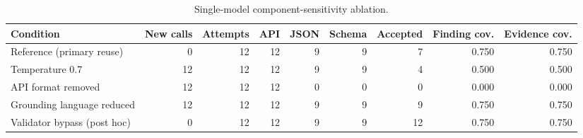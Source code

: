 \begin{table}[htbp]
\centering
\caption{Single-model component-sensitivity ablation.}
\label{tab:llm-ablation}
\small
\begin{adjustbox}{max width=\textwidth}
\begin{tabular}{lrrrrrrrr}
\toprule
Condition & New calls & Attempts & API & JSON & Schema & Accepted & Finding cov. & Evidence cov. \\
\midrule
Reference (primary reuse) & 0 & 12 & 12 & 9 & 9 & 7 & 0.750 & 0.750 \\
Temperature 0.7 & 12 & 12 & 12 & 9 & 9 & 4 & 0.500 & 0.500 \\
API format removed & 12 & 12 & 12 & 0 & 0 & 0 & 0.000 & 0.000 \\
Grounding language reduced & 12 & 12 & 12 & 9 & 9 & 9 & 0.750 & 0.750 \\
Validator bypass (post hoc) & 0 & 12 & 12 & 9 & 9 & 12 & 0.750 & 0.750 \\
\bottomrule
\end{tabular}
\end{adjustbox}
\par{}
\par{}
\end{table}
